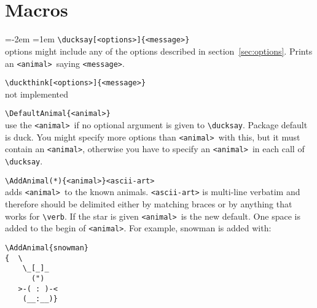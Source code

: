 \documentclass[]{article}
\newcommand*{\anml}{\texttt{<animal>}}
\begin{document}
\begin{titlepage}%
  \makeatletter
  \centering
  \Large
    \\
  \vfill
  \normalsize
  \hspace*{-2cm}
    \ducksay[cow,bubble=\large]{\ducksay@version}\\
  \small
  \vspace*{-5cm}\hspace*{5cm}
  \mbox{}\hfil
  \vspace{2cm}
  \vfill
  \vfill
  \hspace*{-0cm}
  \large
  \small
  \makeatother
\end{titlepage}%
\section{Macros}
\bgroup
\parindent=-2em
\parskip=1em
\hspace*{-2em}%
\verb|\ducksay[<options>]{<message>}|\\
  options might include any of the options described in
  section~\ref{sec:options}. Prints an \anml\ saying \texttt{<message>}.

\verb|\duckthink[<options>]{<message>}|\\
  not implemented

\verb|\DefaultAnimal{<animal>}|\\
  use the \anml\ if no optional argument is given to \verb|\ducksay|. Package
  default is duck. You might specify more options than \anml\ with this, but it
  must contain an \anml, otherwise you have to specify an \anml\ in each call of
  \verb|\ducksay|.

\verb|\AddAnimal(*){<animal>}<ascii-art>|\\
  adds \anml\ to the known animals. \texttt{<ascii-art>} is multi-line verbatim
  and therefore should be delimited either by matching braces or by anything
  that works for \verb|\verb|. If the star is given \anml\ is the new default.
  One space is added to the begin of \anml. For example, snowman is added with:
\begin{verbatim}
\AddAnimal{snowman}
{  \
    \_[_]_
      (")
   >-( : )-<
    (__:__)}
\end{verbatim}
\egroup
\end{document}

